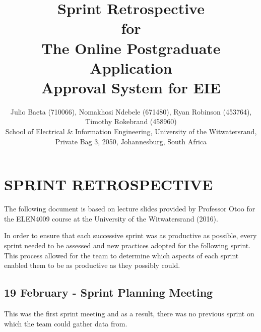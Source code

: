 \documentclass[journal,comsoc,onecolumn]{IEEEtran}
\begin{document}

\title{Sprint Retrospective \\ \vspace{7mm} for \\ \vspace{7mm} The Online Postgraduate Application \\ Approval System for EIE}

\author{\vspace{3mm} Julio Baeta (710066), Nomakhosi Ndebele (671480), Ryan Robinson (453764), Timothy Rokebrand (458960)\\ \small \vspace{2mm} School of Electrical \& Information Engineering, University of the Witwatersrand, Private Bag 3, 2050, Johannesburg, South Africa}

\markboth{}{}

\maketitle

\thispagestyle{empty}


\newpage

\thispagestyle{empty}

\section{SPRINT RETROSPECTIVE}


The following document is based on lecture slides provided by Professor Otoo for the ELEN4009 course at the University of the Witwatersrand (2016). \newline

In order to ensure that each successive sprint was as productive as possible, every sprint needed to be assessed and new practices adopted for the following sprint. This process allowed for the team to determine which aspects of each sprint enabled them to be as productive as they possibly could.


\subsection{19 February - Sprint Planning Meeting}
This was the first sprint meeting and as a result, there was no previous sprint on which the team could gather data from.
\end{document}
